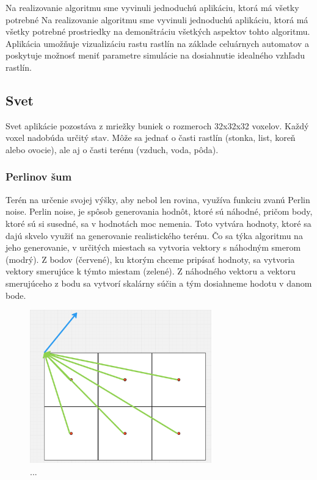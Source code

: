\documentclass[12pt]{article}
\begin{document}
Na realizovanie algoritmu sme vyvinuli jednoduchú aplikáciu, ktorá má všetky
potrebné Na realizovanie algoritmu sme vyvinuli jednoduchú aplikáciu, ktorá má
všetky potrebné prostriedky na demonštráciu všetkých aspektov tohto algoritmu.
Aplikácia umožňuje vizualizáciu rastu rastlín na základe celuárnych automatov
a poskytuje možnosť meniť parametre simulácie na dosiahnutie idealného vzhľadu
rastlín.

\subsection{Svet}

Svet aplikácie pozostáva z mriežky buniek o rozmeroch 32x32x32 voxelov.
Každý voxel nadobúda určitý stav. Môže sa jednať o časti rastlín (stonka, list,
koreň alebo ovocie), ale aj o časti terénu (vzduch, voda, pôda).

\subsubsection{Perlinov šum}

Terén na určenie svojej výšky, aby nebol len rovina, využíva funkciu zvanú
Perlin noise. Perlin noise, je spôsob generovania hodnôt, ktoré sú náhodné,
pričom body, ktoré sú si susedné, sa v hodnotách moc nemenia. Toto vytvára
hodnoty, ktoré sa dajú skvelo využiť na generovanie realistického terénu.
Čo sa týka algoritmu na jeho generovanie, v určitých miestach sa vytvoria
vektory s náhodným smerom (modrý). Z bodov (červené), ku ktorým chceme pripísať
hodnoty, sa vytvoria vektory smerujúce k týmto miestam (zelené). Z náhodného
vektoru a vektoru smerujúceho z bodu sa vytvorí skalárny súčin a tým dosiahneme
hodotu v danom bode.

\begin{figure}[h]
	\centering
	\includegraphics[width=0.7\textwidth]{res/prelinov_sum.png}
	\caption{...}
	\label{obr:perlinov sum}
\end{figure}
\end{document}
